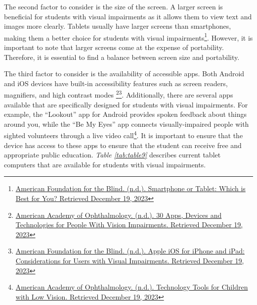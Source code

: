 The second factor to consider is the size of the screen. A larger screen is beneficial for students with visual impairments as it allows them to view text and images more clearly. Tablets usually have larger screens than smartphones, making them a better choice for students with visual impairments\footnote{\raggedright \href{https://www.afb.org/blindness-and-low-vision/using-technology/cell-phones-tablets-mobile/smartphone-or-tablet-which}{American Foundation for the Blind. (n.d.). Smartphone or Tablet: Which is Best for You? Retrieved December 19, 2023}}. However, it is important to note that larger screens come at the expense of portability. Therefore, it is essential to find a balance between screen size and portability.

The third factor to consider is the availability of accessible apps. Both Android and iOS devices have built-in accessibility features such as screen readers, magnifiers, and high contrast modes \footnote{\raggedright \href{https://www.aao.org/eye-health/tips-prevention/low-vision-impairment-apps-tech-assistive-devices }{American Academy of Ophthalmology. (n.d.). 30 Apps, Devices and Technologies for People With Vision Impairments. Retrieved December 19, 2023}}\fnsep\footnote{\raggedright \href{https://www.afb.org/blindness-and-low-vision/using-technology/cell-phones-tablets-mobile/apple-ios-iphone-and-ipad }{American Foundation for the Blind. (n.d.). Apple iOS for iPhone and iPad: Considerations for Users with Visual Impairments. Retrieved December 19, 2023}}. Additionally, there are several apps available that are specifically designed for students with visual impairments. For example, the “Lookout” app for Android provides spoken feedback about things around you, while the “Be My Eyes” app connects visually-impaired people with sighted volunteers through a live video call\footnote{\raggedright \href{https://www.aao.org/eye-health/tips-prevention/technology-apps-devices-children-blind-low-vision}{American Academy of Ophthalmology. (n.d.). Technology Tools for Children with Low Vision. Retrieved December 19, 2023}}. It is important to ensure that the device has access to these apps to ensure that the student can receive free and appropriate public education.
\textit{Table \ref{tab:table9}} describes current tablet computers that are available for students with visual impairments.

\pagebreak 
 
